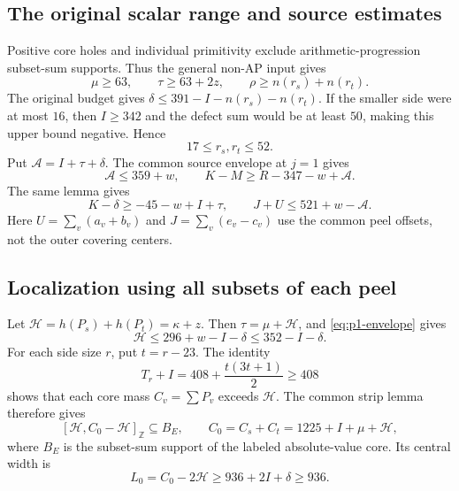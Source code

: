 \documentclass[11pt,letterpaper]{article}
\newcommand{\Z}{\mathbb Z}\newcommand{\R}{\mathbb R}
\theoremstyle{definition}\newtheorem{definition}[theorem]{Definition}
\begin{document}
\subsection{The original scalar range and source estimates}
Positive core holes and individual primitivity exclude arithmetic-progression subset-sum supports. Thus the general non-AP input gives
\[
\mu\ge63,\qquad \tau\ge63+2z,\qquad
\rho\ge n(r_s)+n(r_t).
\]
The original budget gives $\delta\le391-I-n(r_s)-n(r_t)$. If the smaller side were at most $16$, then $I\ge342$ and the defect sum would be at least $50$, making this upper bound negative. Hence
\begin{equation}\label{eq:p1-range}
17\le r_s,r_t\le52.
\end{equation}
Put $\mathcal A=I+\tau+\delta$. The common source envelope at $j=1$ gives
\begin{equation}\label{eq:p1-envelope}
\mathcal A\le359+w,\qquad K-M\ge R-347-w+\mathcal A.
\end{equation}
The same lemma gives
\begin{equation}\label{eq:p1-J}
K-\delta\ge-45-w+I+\tau,\qquad
J+U\le521+w-\mathcal A.
\end{equation}
Here $U=\sum_v(a_v+b_v)$ and $J=\sum_v(e_v-c_v)$ use the common peel offsets, not the outer covering centers.

\subsection{Localization using all subsets of each peel}
Let $\mathcal H=h(P_s)+h(P_t)=\kappa+z$. Then $\tau=\mu+\mathcal H$, and \eqref{eq:p1-envelope} gives
\begin{equation}\label{eq:p1-hole-strip}
\mathcal H\le296+w-I-\delta\le352-I-\delta.
\end{equation}
For each side size $r$, put $t=r-23$. The identity
\[
T_r+I=408+\frac{t(3t+1)}2\ge408
\]
shows that each core mass $C_v=\sum P_v$ exceeds $\mathcal H$. The common strip lemma therefore gives
\[
[\mathcal H,C_0-\mathcal H]_{\Z}\subseteq B_E,
\qquad C_0=C_s+C_t=1225+I+\mu+\mathcal H,
\]
where $B_E$ is the subset-sum support of the labeled absolute-value core. Its central width is
\begin{equation}\label{eq:p1-width}
L_0=C_0-2\mathcal H\ge936+2I+\delta\ge936.
\end{equation}
\end{document}
